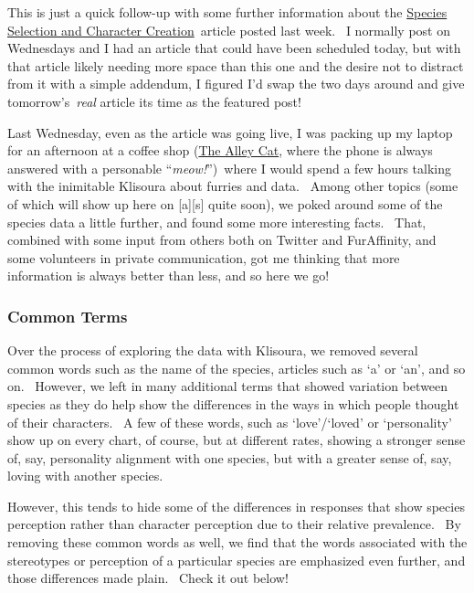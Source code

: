 This is just a quick follow-up with some further information about the
\href{http://adjectivespecies.com/2013/08/07/species-selection-and-character-creation/}{Species
Selection and Character Creation}~article posted last week. ~I normally
post on Wednesdays and I had an article that could have been scheduled
today, but with that article likely needing more space than this one and
the desire not to distract from it with a simple addendum, I figured I'd
swap the two days around and give tomorrow's~\emph{real} article its
time as the featured post!

Last Wednesday, even as the article was going live, I was packing up my
laptop for an afternoon at a coffee shop
(\href{http://www.alleycatcoffeehouse.com/}{The Alley Cat}, where the
phone is always answered with a personable ``\emph{meow!}'')~where I
would spend a few hours talking with the inimitable Klisoura about
furries and data. ~Among other topics (some of which will show up here
on {[}a{]}{[}s{]} quite soon), we poked around some of the species data
a little further, and found some more interesting facts. ~That, combined
with some input from others both on Twitter and FurAffinity, and some
volunteers in private communication, got me thinking that more
information is always better than less, and so here we go!

\subsubsection{Common Terms}\label{common-terms}

Over the process of exploring the data with Klisoura, we removed several
common words such as the name of the species, articles such as `a' or
`an', and so on. ~However, we left in many additional terms that showed
variation between species as they do help show the differences in the
ways in which people thought of their characters. ~A few of these words,
such as `love'/`loved' or `personality' show up on every chart, of
course, but at different rates, showing a stronger sense of, say,
personality alignment with one species, but with a greater sense of,
say, loving with another species.

However, this tends to hide some of the differences in responses that
show species perception rather than character perception due to their
relative prevalence. ~By removing these common words as well, we find
that the words associated with the stereotypes or perception of a
particular species are emphasized even further, and those differences
made plain. ~Check it out below!

